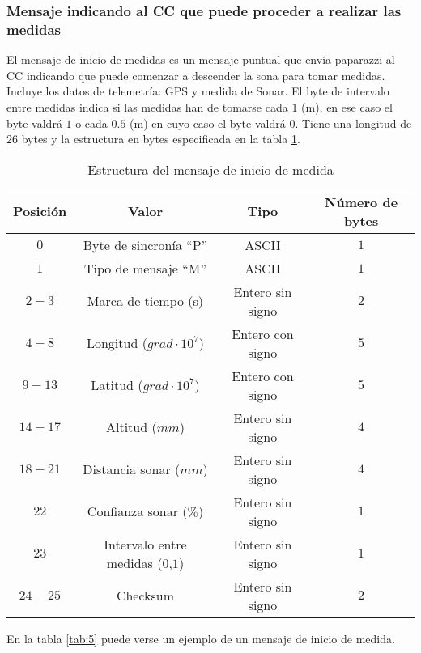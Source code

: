 \subsubsection{Mensaje indicando al CC que puede proceder a realizar las medidas}

El mensaje de inicio de medidas es un mensaje puntual que envía paparazzi al CC indicando que puede comenzar a descender la sona para tomar medidas. Incluye los datos de telemetría: GPS y medida de Sonar. El byte de intervalo entre medidas indica si las medidas han de tomarse cada $1$ (m), en ese caso el byte valdrá $1$ o cada $0.5$ (m) en cuyo caso el byte valdrá $0$. Tiene una longitud de $26$ bytes y la estructura en bytes especificada en la tabla \ref{tab:4}.

\begin{table}[h]
	\centering
	\caption{Estructura del mensaje de inicio de medida}
	\begin{tabular}{|c|c|c|c|}\hline 
		\textbf{Posición}	& \textbf{Valor} & \textbf{Tipo} &\textbf{Número de bytes} \\ \hline \hline 
		$0$		& Byte de sincronía ``P''				& ASCII	 			&	$1$ \\  \hline
		$1$		& Tipo de mensaje ``M''				& ASCII	 			&	$1$ \\  \hline
		$2-3$	& Marca de tiempo (s)				& Entero sin signo	&   $2$ \\  \hline
		$4-8$	& Longitud ($grad \cdot 10^{7}$)	& Entero con signo	&   $5$ \\  \hline
		$9-13$	& Latitud ($grad \cdot 10^{7}$)		& Entero con signo	&  	$5$ \\  \hline
		$14-17$	& Altitud ($mm$)					& Entero sin signo	&   $4$ \\  \hline
		$18-21$	& Distancia sonar ($mm$)			& Entero sin signo	&   $4$ \\  \hline
		$22$	& Confianza sonar ($\%$)			& Entero sin signo	&   $1$ \\  \hline
		$23$	& Intervalo entre medidas ($0$,$1$)	& Entero sin signo	&   $1$ \\  \hline		
		$24-25$	& Checksum 							& Entero sin signo	&   $2$ \\  \hline
	\end{tabular}
	\label{tab:4}
\end{table}

En la tabla \ref{tab:5} puede verse un ejemplo de un mensaje de inicio de medida.

